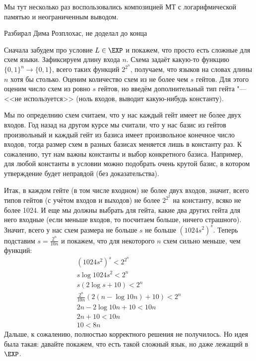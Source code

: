 	\begin{Rem}
		Мы тут несколько раз воспользовались композицией МТ с логарифмической памятью
		и неограниченным выводом.
	\end{Rem}

	Разбирал Дима Розплохас, не доделал до конца

	Сначала забудем про условие $L \in \EXP$ и покажем, что просто есть сложные для схем языки.
	Зафиксируем длину входа $n$.
	Схема задаёт какую-то функцию $\{0, 1\}^n \to \{0, 1\}$, всего таких функций $2^{2^n}$,
	получаем, что языков на словах длины $n$ хотя бы столько.
	Оценим количество схем из не более чем $s$ гейтов.
	Для этого оценим число схем из ровно $s$ гейтов, но введём дополнительный тип гейта "--- <<не используется>>
	(ноль входов, выводит какую-нибудь константу).
	\begin{Rem}
		Мы по определнию схем считаем, что у нас каждый гейт имеет не более двух входов.
		Год назад на другом курсе мы считали, что у нас базис из гейтов произвольный и каждый гейт
		из базиса имеет произвольное конечное число входов, тогда размер схем в разных базисах
		меняется лишь в константу раз.
		К сожалению, тут нам важны константы и выбор конкретного базиса.
		Например, для любой константы в условии можно подобрать очень крутой базис, в котором
		утверждение будет неправдой (без доказательства).
	\end{Rem}
	Итак, в каждом гейте (в том числе входном) не более двух входов, значит, всего типов гейтов
	(с учётом входов и выходов) не более $2^{2^2}$ на константу, всяко не более 1024.
	И еще мы должны выбрать для гейта, какие два других гейта для него входные
	(если меньше входов, то посчитаем больше, ничего страшного).
	Значит, всего у нас схем размера не больше $s$ не больше $(1024s^2)^s$.
	Теперь подставим $s=\frac{2^n}{10n}$ и покажем, что для некоторого $n$ схем сильно меньше, чем функций:
	\begin{gather*}
		(1024s^2)^s < 2^{2^n} \\
		s \log 1024s^2 < 2^n \\
		s (2\log s + 10) < 2^n \\
		\frac{2^n}{10n} (2(n-\log 10n) + 10) < 2^n \\
		2n-2\log 10n + 10 < 10n \\
		2n + 10 < 10n \\
		10 < 8n
	\end{gather*}
	Дальше, к сожалению, полностью корректного решения не получилось.
	Но идея была такая: 
	давайте покажем, что есть такой сложный язык, но даже лежащий в $\EXP$.
